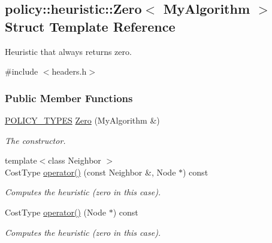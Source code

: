 \hypertarget{structpolicy_1_1heuristic_1_1Zero}{}\subsection{policy\+:\+:heuristic\+:\+:Zero$<$ My\+Algorithm $>$ Struct Template Reference}
\label{structpolicy_1_1heuristic_1_1Zero}


Heuristic that always returns zero.  




{\ttfamily \#include $<$headers.\+h$>$}

\subsubsection*{Public Member Functions}
\begin{DoxyCompactItemize}
\item 
\hyperlink{extensions_2shared__policies_2headers_8h_ae70a06fa4631780beea14971eb36a562}{P\+O\+L\+I\+C\+Y\+\_\+\+T\+Y\+P\+ES} \hyperlink{structpolicy_1_1heuristic_1_1Zero_a165181f37ac27c956a60cf8388e7ea8a}{Zero} (My\+Algorithm \&)\hypertarget{structpolicy_1_1heuristic_1_1Zero_a165181f37ac27c956a60cf8388e7ea8a}{}\label{structpolicy_1_1heuristic_1_1Zero_a165181f37ac27c956a60cf8388e7ea8a}

\begin{DoxyCompactList}\small\item\em The constructor. \end{DoxyCompactList}\item 
{\footnotesize template$<$class Neighbor $>$ }\\Cost\+Type \hyperlink{structpolicy_1_1heuristic_1_1Zero_a14d4f65868894ccd999d4ab2d7a407de}{operator()} (const Neighbor \&, Node $\ast$) const 
\begin{DoxyCompactList}\small\item\em Computes the heuristic (zero in this case). \end{DoxyCompactList}\item 
Cost\+Type \hyperlink{structpolicy_1_1heuristic_1_1Zero_ad1a76c711890da1740f1625e243cfbf9}{operator()} (Node $\ast$) const 
\begin{DoxyCompactList}\small\item\em Computes the heuristic (zero in this case). \end{DoxyCompactList}\end{DoxyCompactItemize}



